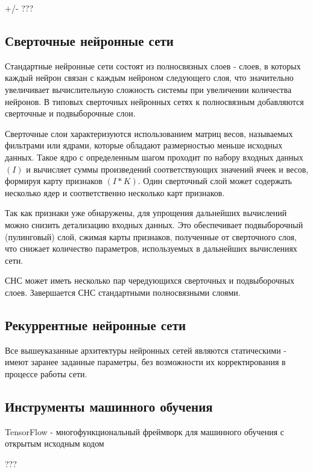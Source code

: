 +/- ???

\subsection{Сверточные нейронные сети}
Стандартные нейронные сети состоят из полносвязных слоев - слоев, в которых каждый нейрон связан с каждым нейроном следующего слоя, что значительно увеличивает вычислительную сложность системы при увеличении количества нейронов. 
В типовых сверточных нейронных сетях к полносвязным добавляются сверточные и подвыборочные слои. 

Сверточные слои характеризуются использованием матриц весов, называемых фильтрами или ядрами, которые обладают размерностью меньше исходных данных. Такое ядро с определенным шагом проходит по набору входных данных $(I)$ и вычисляет суммы произведений соответствующих значений ячеек и весов, формируя карту признаков $(I * K)$. Один сверточный слой может содержать несколько ядер и соответственно несколько карт признаков.



Так как признаки уже обнаружены, для упрощения дальнейших вычислений можно снизить детализацию входных данных. Это обеспечивает подвыборочный (пулинговый) слой, сжимая карты признаков, полученные от сверточного слоя, что снижает количество параметров, используемых в дальнейших вычислениях сети. 

СНС может иметь несколько пар чередующихся сверточных и подвыборочных слоев. Завершается СНС стандартными полносвязными слоями.  

\subsection{Рекуррентные нейронные сети}
Все вышеуказанные архитектуры нейронных сетей являются статическими - имеют заранее заданные параметры, без возможности их корректирования в процессе работы сети.

\subsection{Инструменты машинного обучения}

TensorFlow - многофункциональный фреймворк для машинного обучения с открытым исходным кодом

???
\clearpage